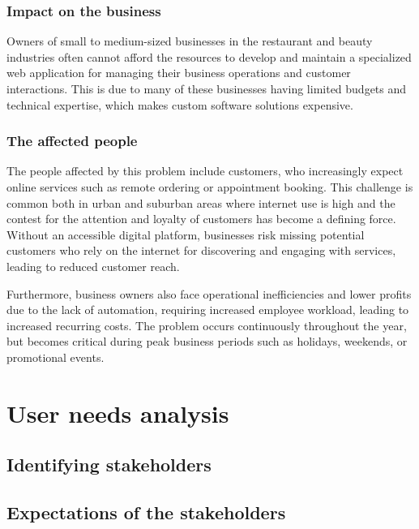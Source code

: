 \documentclass[]{VUMIFTemplateClass}
\begin{document}
\subsubsection{Impact on the business}

Owners of small to medium-sized businesses in the restaurant and beauty industries often cannot afford the resources to develop and maintain a specialized web application for managing their business operations and customer interactions. This is due to many of these businesses having limited budgets and technical expertise, which makes custom software solutions expensive.

\subsubsection{The affected people}

The people affected by this problem include customers, who increasingly expect online services such as remote ordering or appointment booking. This challenge is common both in urban and suburban areas where internet use is high and the contest for the attention and loyalty of customers has become a defining force. Without an accessible digital platform, businesses risk missing potential customers who rely on the internet for discovering and engaging with services, leading to reduced customer reach. 

Furthermore, business owners also face operational inefficiencies and lower profits due to the lack of automation, requiring increased employee workload, leading to increased recurring costs. The problem occurs continuously throughout the year, but becomes critical during peak business periods such as holidays, weekends, or promotional events.

\section{User needs analysis}


\subsection{Identifying stakeholders}


\subsection{Expectations of the stakeholders}
\end{document}
